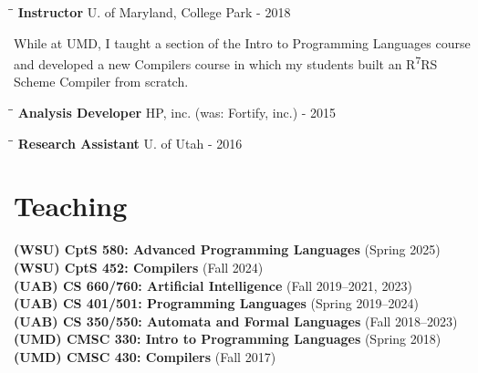 \documentclass[line]{res}
\begin{document}
\begin{resume}
   \vspace{-0.2cm}  
   \begin{tabbing}
    \hspace{2.25in}\= \hspace{2.25in}\= \kill %
    {\bf Instructor} \>U. of Maryland, College Park   - 2018
   \end{tabbing}\vspace{-0.5cm}      %
   While at UMD, I taught a section of the Intro to Programming Languages course and developed a new Compilers course in which my students built an R\textsuperscript{7}RS Scheme Compiler from scratch. 
   \vspace{-0.2cm}
   \begin{tabbing}
    \hspace{2.25in}\= \hspace{2.25in}\= \kill %
    {\bf Analysis Developer} \>HP, inc. (was: Fortify, inc.)      - 2015
   \end{tabbing}\vspace{-0.5cm}      %
   \vspace{-0.2cm}  
   \begin{tabbing}
    \hspace{2.25in}\= \hspace{2.25in}\= \kill %
    {\bf Research Assistant} \>U. of Utah      - 2016
   \end{tabbing}\vspace{-0.5cm}      %

\section{\large Teaching} \vspace{0.2in}
    
\textbf{(WSU) CptS 580: Advanced Programming Languages} (Spring 2025) \\
\textbf{(WSU) CptS 452: Compilers} (Fall 2024) \\
\textbf{(UAB) CS 660/760: Artificial Intelligence} (Fall 2019--2021, 2023) \\
\textbf{(UAB) CS 401/501: Programming Languages} (Spring 2019--2024) \\ 
\textbf{(UAB) CS 350/550: Automata and Formal Languages} (Fall 2018--2023) \\
\textbf{(UMD) CMSC 330: Intro to Programming Languages} (Spring 2018) \\
\textbf{(UMD) CMSC 430: Compilers} (Fall 2017)


\end{resume}
\end{document}
